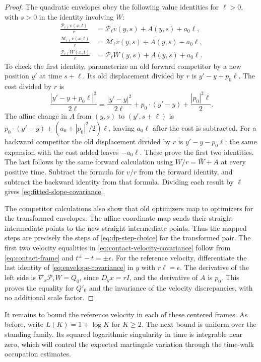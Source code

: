 \documentclass[11pt]{article}
\numberwithin{equation}{section}
\theoremstyle{definition}
\theoremstyle{remark}
\newcommand{\Penv}{\mathcal{P}}
\newcommand{\Menv}{\mathcal{M}}
\begin{document}
\begin{proof}
The quadratic envelopes obey the following value identities for $\ell>0$,
with $s>0$ in the identity involving $W$:
\begin{equation}\label{eq:envelope-covariance}
\begin{split}
  \frac{\Penv_{r\ell}v(x,t)}{r}
    &=\Penv_\ell\bar v(y,s)+A(y,s)+a_0\ell,\\
  \frac{\Menv_{r\ell}v(x,t)}{r}
    &=\Menv_\ell\bar v(y,s)+A(y,s)-a_0\ell,\\
  \frac{\Penv_{r\ell}W(x,t)}{r}
    &=\Penv_\ell\bar W(y,s)+A(y,s)+a_0\ell.
\end{split}
\end{equation}
To check the first identity, parameterize an old forward competitor by a
new position $y'$ at time $s+\ell$.  Its old displacement divided by $r$
is $y'-y+p_0\ell$.  The cost divided by $r$ is
\[
  \frac{|y'-y+p_0\ell|^2}{2\ell}
    =\frac{|y'-y|^2}{2\ell}+p_0\cdot(y'-y)
                                     +\frac{|p_0|^2\ell}{2}.
\]
The affine change in $A$ from $(y,s)$ to $(y',s+\ell)$ is
$p_0\cdot(y'-y)+(a_0+|p_0|^2/2)\ell$, leaving $a_0\ell$ after the cost is
subtracted.  For a backward competitor the old displacement divided by $r$
is $y'-y-p_0\ell$; the same expansion with the cost added leaves
$-a_0\ell$.  These prove the first two identities.  The last follows by the
same forward calculation using $W/r=\bar W+A$ at every positive time.
Subtract the formula for $v/r$ from the forward identity, and subtract the
backward identity from that formula.  Dividing each result by $\ell$ gives
\eqref{eq:fitted-slope-covariance}.

The competitor calculations also show that old optimizers map to optimizers
for the transformed envelopes.  The affine coordinate map sends their
straight intermediate points to the new straight intermediate points.
Thus the mapped steps are precisely the steps of
\eqref{eq:dp-step-choice} for the transformed pair.  The first two velocity
equalities in \eqref{eq:contact-velocity-covariance} follow from
\eqref{eq:contact-frame} and $t^\pm-t=\pm\epsilon$.  For the reference
velocity, differentiate the last identity of \eqref{eq:envelope-covariance}
in $y$ with $r\ell=\epsilon$.  The derivative of the left side is
$\nabla_x\Penv_\epsilon W=Q_0$, since $D_yx=rI$, and the derivative of $A$
is $p_0$.  This proves the equality for $Q'_0$ and the invariance of the
velocity discrepancies, with no additional scale factor.
\end{proof}

It remains to bound the reference velocity in each of these centered
frames.  As before, write $L(K)=1+\log K$ for $K\ge2$.  The next bound is
uniform over the standing family.  Its squared logarithmic singularity in
time is integrable near zero, which will control the expected martingale
variation through the time-walk occupation estimates.
\end{document}
